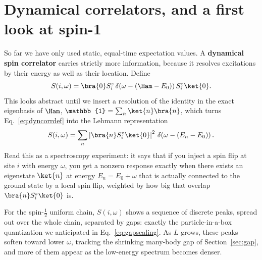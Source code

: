\documentclass[all_sessions.tex]{subfiles}
\begin{document}
\section{Dynamical correlators, and a first look at spin-1}
\label{sec:dynamical}
So far we have only used static, equal-time expectation values. A \textbf{dynamical spin correlator}
carries strictly more information, because it resolves excitations by their energy as well as their
location. Define
\begin{equation}
  S(i,\omega) = \bra{0}S_i^z\,\delta(\omega - (\Ham-E_0))\,S_i^z\ket{0}.
  \label{eq:dyncorrdef}
\end{equation}
This looks abstract until we insert a resolution of the identity in the exact eigenbasis of $\Ham$,
$\mathbb{1}=\sum_n\ket{n}\bra{n}$, which turns Eq.~\eqref{eq:dyncorrdef} into the Lehmann representation
\begin{equation}
  S(i,\omega) = \sum_n \left|\bra{n}S_i^z\ket{0}\right|^2 \, \delta\!\left(\omega - (E_n-E_0)\right).
  \label{eq:lehmann}
\end{equation}
Read this as a spectroscopy experiment: it says that if you inject a spin flip at site $i$ with energy
$\omega$, you get a nonzero response exactly when there exists an eigenstate $\ket{n}$ at energy
$E_n=E_0+\omega$ that is actually connected to the ground state by a local spin flip, weighted by how big
that overlap $\bra{n}S_i^z\ket{0}$ is.

For the spin-$\tfrac12$ uniform chain, $S(i,\omega)$ shows a sequence of discrete peaks, spread out over
the whole chain, separated by gaps: exactly the particle-in-a-box quantization we anticipated in
Eq.~\eqref{eq:gapscaling}. As $L$ grows, these peaks soften toward lower $\omega$, tracking the shrinking
many-body gap of Section~\ref{sec:gap}, and more of them appear as the low-energy spectrum becomes
denser.
\end{document}
